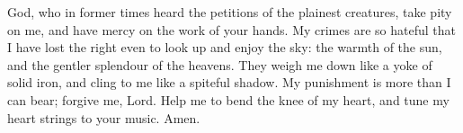 God, who in former times heard the petitions of the plainest creatures, take pity on me, and have mercy on the work of your hands. My crimes are so hateful that I have lost the right even to look up and enjoy the sky: the warmth of the sun, and the gentler splendour of the heavens. They weigh me down like a yoke of solid iron, and cling to me like a spiteful shadow. My punishment is more than I can bear; forgive me, Lord. Help me to bend the knee of my heart, and tune my heart strings to your music. Amen.
